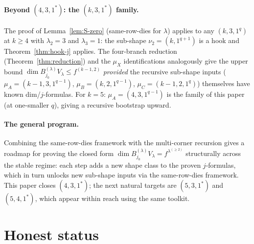 \documentclass[11pt]{article}
\theoremstyle{definition}
\begin{document}
\paragraph{Beyond $(4, 3, 1^*)$: the $(k, 3, 1^*)$ family.}
The proof of Lemma~\ref{lem:S-zero} (same-row-dies for $\lambda$)
applies to any $(k, 3, 1^q)$ at $k \ge 4$ with $\lambda_2 = 3$
and $\lambda_3 = 1$: the sub-shape $\nu_2 = (k, 1^{q+1})$ is a
hook and Theorem~\ref{thm:hook-j} applies. The four-branch
reduction (Theorem~\ref{thm:reduction}) and the $\mu_X$ identifications
analogously give the upper bound
$\dim B^{(\lambda)}_{j_0} V_\lambda \le f^{(k-1, 2)}$
\emph{provided} the recursive sub-shape inputs
($\mu_A = (k-1, 3, 1^{q-1})$, $\mu_B = (k, 2, 1^{q-1})$,
$\mu_C = (k-1, 2, 1^q)$) themselves have known dim/$j$-formulas.
For $k = 5$: $\mu_A = (4, 3, 1^{q-1})$ is the family of this paper
(at one-smaller $q$), giving a recursive bootstrap upward.

\paragraph{The general program.}
Combining the same-row-dies framework with the multi-corner recursion
gives a roadmap for proving the closed form
$\dim B^{(\lambda)}_{j_0} V_\lambda = f^{\lambda^{(\ge 2)}}$
structurally across the stable regime: each step adds a new shape
class to the proven $j$-formulas, which in turn unlocks new
sub-shape inputs via the same-row-dies framework. This paper closes
$(4, 3, 1^*)$; the next natural targets are $(5, 3, 1^*)$ and
$(5, 4, 1^*)$, which appear within reach using the same toolkit.

\section{Honest status}\label{sec:honest}
\end{document}
